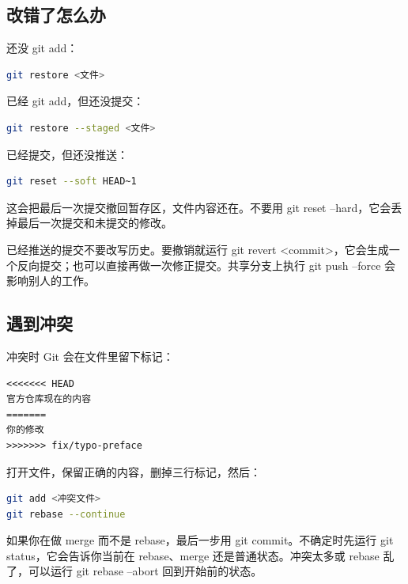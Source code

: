 \documentclass[UTF8,fontset=none,a4paper,11pt]{ctexart}
\newcommand{\code}[1]{{\CJKsetecglue{}\ttfamily #1}}
\begin{document}
\subsection{改错了怎么办}\label{sec:undo}

还没 \code{git add}：

\begin{lstlisting}[language=bash]
git restore <文件>
\end{lstlisting}

已经 \code{git add}，但还没提交：

\begin{lstlisting}[language=bash]
git restore --staged <文件>
\end{lstlisting}

已经提交，但还没推送：

\begin{lstlisting}[language=bash]
git reset --soft HEAD~1
\end{lstlisting}

这会把最后一次提交撤回暂存区，文件内容还在。不要用 \code{git reset --hard}，它会丢掉最后一次提交和未提交的修改。

已经推送的提交不要改写历史。要撤销就运行 \code{git revert <commit>}，它会生成一个反向提交；也可以直接再做一次修正提交。共享分支上执行 \code{git push --force} 会影响别人的工作。

\subsection{遇到冲突}\label{sec:conflicts}

冲突时 Git 会在文件里留下标记：

\begin{lstlisting}
<<<<<<< HEAD
官方仓库现在的内容
=======
你的修改
>>>>>>> fix/typo-preface
\end{lstlisting}

打开文件，保留正确的内容，删掉三行标记，然后：

\begin{lstlisting}[language=bash]
git add <冲突文件>
git rebase --continue
\end{lstlisting}

如果你在做 merge 而不是 rebase，最后一步用 \code{git commit}。不确定时先运行 \code{git status}，它会告诉你当前在 rebase、merge 还是普通状态。冲突太多或 rebase 乱了，可以运行 \code{git rebase --abort} 回到开始前的状态。
\end{document}
